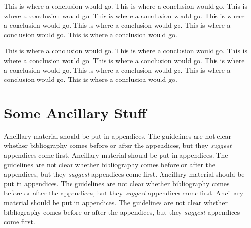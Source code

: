 \documentclass[11pt]{ucscthesisbs}
\begin{document}
This is where a conclusion would go.
This is where a conclusion would go.
This is where a conclusion would go.
This is where a conclusion would go.
This is where a conclusion would go.
This is where a conclusion would go.
This is where a conclusion would go.
This is where a conclusion would go.

This is where a conclusion would go.
This is where a conclusion would go.
This is where a conclusion would go.
This is where a conclusion would go.
This is where a conclusion would go.
This is where a conclusion would go.
This is where a conclusion would go.
This is where a conclusion would go.

\appendix
\chapter{Some Ancillary Stuff}

Ancillary material should be put in appendices.  The guidelines are not
clear whether bibliography comes before or after the appendices, but they
\emph{suggest} appendices come first.
Ancillary material should be put in appendices.  The guidelines are not
clear whether bibliography comes before or after the appendices, but they
\emph{suggest} appendices come first.
Ancillary material should be put in appendices.  The guidelines are not
clear whether bibliography comes before or after the appendices, but they
\emph{suggest} appendices come first.
Ancillary material should be put in appendices.  The guidelines are not
clear whether bibliography comes before or after the appendices, but they
\emph{suggest} appendices come first.




\end{document}
